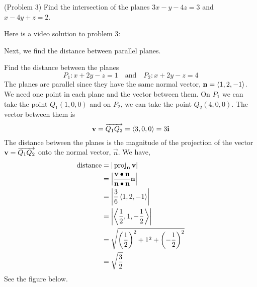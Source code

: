 \documentclass[handout]{ximera}
\begin{document}
\begin{problem}(Problem 3)
Find the intersection of the planes $3x - y -4z = 3$ and $x - 4y + z = 2$.\\
\end{problem}

Here is a video solution to problem 3:\\
\begin{foldable}
\end{foldable}
Next, we find the distance between parallel planes.

\begin{example}[Example 4]
Find the distance between the planes 
\[
P_1: x +2y - z = 1 \quad \text{and} \quad P_2: x+2y-z = 4
\]
The planes are parallel since they have the same normal vector, $\mathbf{n} = \left\langle 1, 2, -1\right\rangle$. 
We need one point in each plane and the vector between them.
On $P_1$ we can take the point $Q_1(1, 0, 0)$ and on $P_2$, we can take the point $Q_2(4, 0, 0)$. 
The vector between them is 
\[
\mathbf{v} = \overrightarrow{Q_1Q_2} = \left\langle 3,0,0\right\rangle = 3\mathbf{i}
\]
The distance between the planes is the magnitude of the projection of the vector $\mathbf{v} = \overrightarrow{Q_1Q_2}$ onto the 
normal vector, $\vec{n}$. We have,
\begin{align*}
\text{distance} &= | \operatorname{proj}_{\mathbf{n}}\mathbf{v}| \\
               &= \left| \frac{\mathbf{v}\bullet \mathbf{n}}{\mathbf{n}\bullet \mathbf{n}} \mathbf{n}\right|\\
               &= \left|\frac{3}{6} \left\langle 1, 2, -1\right\rangle\right|\\
               &= \left| \left\langle \frac12, 1, -\frac12\right\rangle\right|\\
               &= \sqrt{\left( \frac12\right)^2 + 1^2 + \left( -\frac12\right)^2}\\
               & = \sqrt{\frac32}
\end{align*}
See the figure below.

\begin{image}
\end{image}

\end{example}
\end{document}
